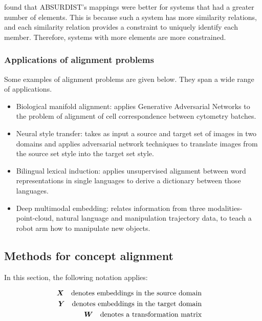 \cite{GOLDSTONE2002295} found that ABSURDIST's mappings were better for systems that had a greater number of elements. This is because such a system has more similarity relations, and each similarity relation provides a constraint to uniquely identify each member. Therefore, systems with more elements are more constrained. 

\subsubsection{Applications of alignment problems}

Some examples of alignment problems are given below. They span a wide range of applications. 

\begin{itemize}
    \item Biological manifold alignment: \cite{magan} applies Generative Adversarial Networks \cite{GAN} to the problem of alignment of cell correspondence between cytometry batches.
    \item Neural style transfer: \cite{CycleGAN} takes as input a source and target set of images in two domains and applies adversarial network techniques to translate images from the source set style into the target set style. 
    \item Bilingual lexical induction: \cite{wordtranslationwithoutparalleldata} applies unsupervised alignment between word representations in single languages to derive a dictionary between those languages.
    \item Deep multimodal embedding: \cite{DeepMultimodalEmbedding} relates information from three modalities- point-cloud, natural language and manipulation trajectory data, to teach a robot arm  how to manipulate new objects. 
\end{itemize}

\subsection{Methods for concept alignment}

In this section, the following notation applies:

\begin{equation}
\begin{split}
    \boldsymbol{X} \quad \text{denotes embeddings in the source domain} \quad\\
    \boldsymbol{Y} \quad \text{denotes embeddings in the target domain} \quad\\
    \boldsymbol{W} \quad \text{denotes a transformation matrix} \quad\\
\end{split}
\end{equation}


